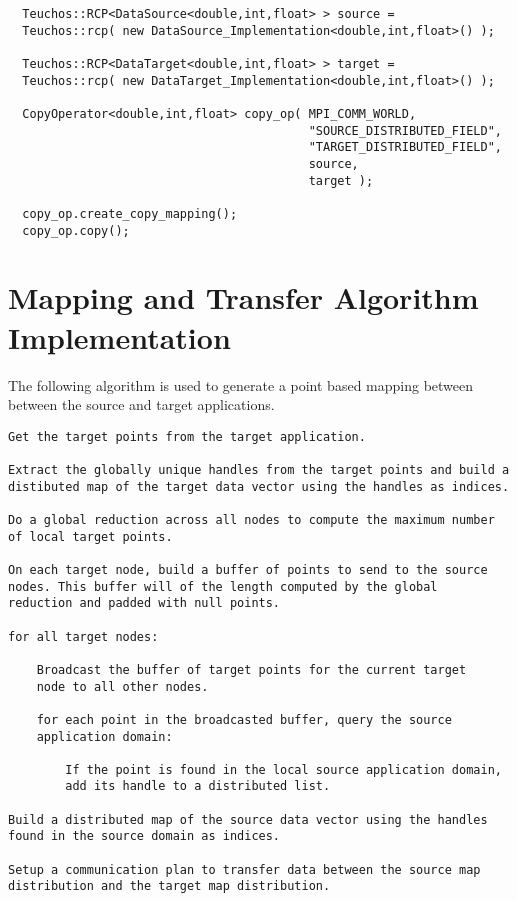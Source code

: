 \documentclass[letterpaper]{article}
\begin{document}
\begin{lstlisting}
  Teuchos::RCP<DataSource<double,int,float> > source = 
  Teuchos::rcp( new DataSource_Implementation<double,int,float>() );

  Teuchos::RCP<DataTarget<double,int,float> > target = 
  Teuchos::rcp( new DataTarget_Implementation<double,int,float>() );

  CopyOperator<double,int,float> copy_op( MPI_COMM_WORLD, 
                                          "SOURCE_DISTRIBUTED_FIELD",
                                          "TARGET_DISTRIBUTED_FIELD",
                                          source, 
                                          target ); 
                                         
  copy_op.create_copy_mapping();
  copy_op.copy();
\end{lstlisting}

\section{Mapping and Transfer Algorithm Implementation}
The following algorithm is used to generate a point based mapping
between between the source and target applications.

\begin{verbatim}
Get the target points from the target application.

Extract the globally unique handles from the target points and build a
distibuted map of the target data vector using the handles as indices.

Do a global reduction across all nodes to compute the maximum number
of local target points.

On each target node, build a buffer of points to send to the source
nodes. This buffer will of the length computed by the global
reduction and padded with null points.

for all target nodes:

    Broadcast the buffer of target points for the current target
    node to all other nodes.

    for each point in the broadcasted buffer, query the source
    application domain:

        If the point is found in the local source application domain,
        add its handle to a distributed list.

Build a distributed map of the source data vector using the handles
found in the source domain as indices.

Setup a communication plan to transfer data between the source map
distribution and the target map distribution.
\end{verbatim}
\end{document}
